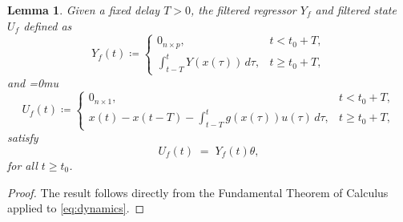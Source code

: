 \documentclass[10pt,a4paper]{amsart}
\newtheorem{lemma}{Lemma}
\begin{document}
\begin{lemma}\label{lem:ErrorTermformulation}
Given a fixed delay $T>0$, the filtered regressor $Y_f$ and filtered state $U_f$  defined as
\begin{equation*}
    Y_f(t) \coloneqq 
    \begin{cases} 
      0_{n \times p}, & t < t_0+T, \\
      \int_{t-T}^{t} Y(x(\tau))\,d\tau, & t \ge t_0 +T,
    \end{cases}
\end{equation*}
and
\begingroup\medmuskip=0mu\begin{equation*}
    U_f(t) \coloneqq 
    \begin{cases} 
      0_{n \times 1}, & t < t_0 + T,\\
      x(t) - x(t - T) - \int_{t-T}^{t} g(x(\tau))u(\tau)\,d\tau, & t \ge t_0 + T,
    \end{cases}
\end{equation*}\endgroup
satisfy
\begin{equation}\label{eq:incrementalRelation}
    U_f(t) \;=\; Y_f(t)\theta,
\end{equation}
for all $t\ge t_0$.
\end{lemma}

\begin{proof}
The result follows directly from the Fundamental Theorem of Calculus applied to \eqref{eq:dynamics}.
\end{proof}
\end{document}
